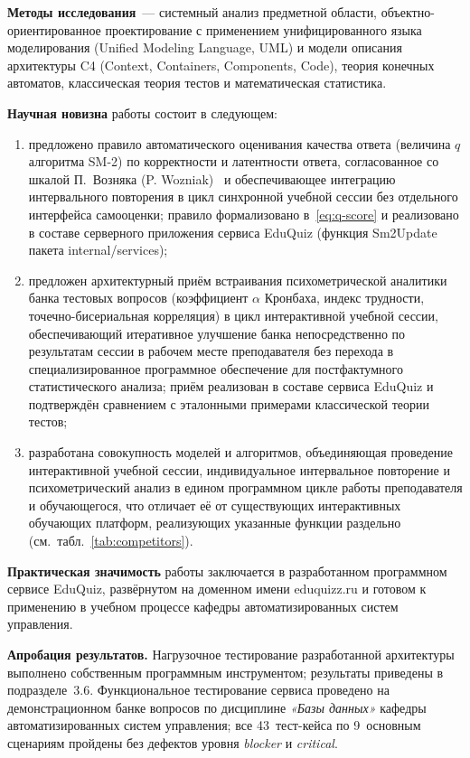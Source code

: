 \textbf{Методы исследования}~--- системный анализ предметной
области, объектно-ориентированное проектирование с применением
унифицированного языка моделирования (Unified Modeling Language,
UML) и модели описания архитектуры C4 (Context, Containers,
Components, Code), теория конечных автоматов, классическая теория
тестов и математическая статистика.

\textbf{Научная новизна} работы состоит в следующем:
\begin{enumerate}
    \item предложено правило автоматического оценивания качества
          ответа (величина $q$ алгоритма SM-2) по корректности
          и латентности ответа, согласованное со шкалой
          П.~Возняка (P. Wozniak)~\cite{wozniak1990} и обеспечивающее интеграцию
          интервального повторения в цикл синхронной учебной сессии
          без отдельного интерфейса самооценки; правило
          формализовано в~\eqref{eq:q-score} и
          реализовано в составе серверного приложения сервиса
          EduQuiz (функция Sm2Update пакета
          internal/services);
    \item предложен архитектурный приём встраивания психометрической
          аналитики банка тестовых вопросов (коэффициент $\alpha$
          Кронбаха, индекс трудности, точечно-бисериальная
          корреляция) в цикл интерактивной учебной сессии,
          обеспечивающий итеративное улучшение банка непосредственно
          по результатам сессии в рабочем месте преподавателя
          без перехода в специализированное программное обеспечение
          для постфактумного статистического анализа; приём
          реализован в составе сервиса EduQuiz и подтверждён
          сравнением с эталонными примерами классической теории
          тестов;
    \item разработана совокупность моделей и алгоритмов, объединяющая
          проведение интерактивной учебной сессии, индивидуальное
          интервальное повторение и психометрический анализ
          в едином программном цикле работы преподавателя
          и обучающегося, что отличает её от существующих
          интерактивных обучающих платформ, реализующих указанные
          функции раздельно (см.~табл.~\ref{tab:competitors}).
\end{enumerate}

\textbf{Практическая значимость} работы заключается в разработанном
программном сервисе EduQuiz, развёрнутом на доменном имени
eduquizz.ru и готовом к применению в учебном процессе
кафедры автоматизированных систем управления.

\textbf{Апробация результатов.}
Нагрузочное тестирование разработанной архитектуры выполнено
собственным программным инструментом; результаты приведены
в подразделе~3.6. Функциональное тестирование сервиса
проведено на демонстрационном банке вопросов по дисциплине
\textit{«Базы данных»} кафедры автоматизированных систем
управления; все 43~тест-кейса по 9~основным сценариям пройдены
без дефектов уровня \emph{blocker} и \emph{critical}.

\newpage
